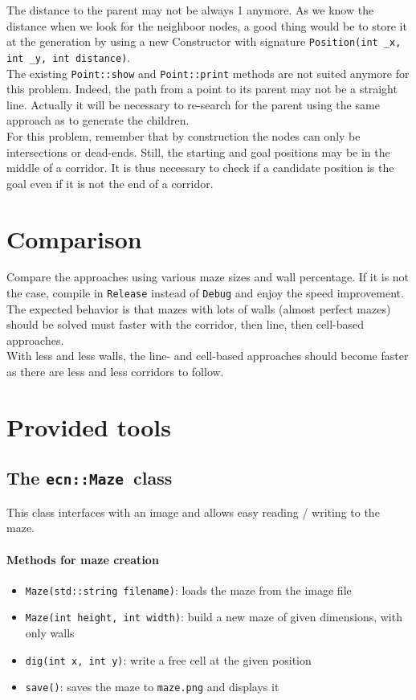 \documentclass{ecnreport}
\def\maze{\texttt{ecn::Maze}~}
\begin{document}
The distance to the parent may not be always 1 anymore. As we know the distance when we look for the neighboor nodes, a good thing would be to store it 
at the generation by using a new Constructor with signature \texttt{Position(int \_x, int \_y, int distance)}. \\

The existing \texttt{Point::show} and \texttt{Point::print} methods are not suited anymore for this problem. Indeed, the path from a point to its parent 
may not be a straight line. Actually it will be necessary to re-search for the parent using the same approach as to generate the children.\\

For this problem, remember that by construction the nodes can only be intersections or dead-ends. Still, the starting and goal positions may 
be in the middle of a corridor. It is thus necessary to check if a candidate position is the goal even if it is not the end of a corridor.

\section{Comparison}

Compare the approaches using various maze sizes and wall percentage.
If it is not the case, compile in \texttt{Release} instead of \texttt{Debug} and enjoy the speed improvement.\\

The expected behavior is that mazes with lots of walls (almost perfect mazes) should be solved must faster with the corridor, then line, then cell-based approaches.\\
With less and less walls, the line- and cell-based approaches should become faster as there are less and less corridors to follow.

\appendix

\section{Provided tools}

\subsection{The \maze class}\label{mazeClass}

This class interfaces with an image and allows easy reading / writing to the maze. 

\paragraph{Methods for maze creation}
\begin{itemize}
 \item \texttt{Maze(std::string filename)}: loads the maze from the image file
 \item \texttt{Maze(int height, int width)}: build a new maze of given dimensions, with only walls
 \item \texttt{dig(int x, int y)}: write a free cell at the given position
 \item \texttt{save()}: saves the maze to \texttt{maze.png} and displays it
\end{itemize}
\end{document}

